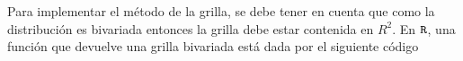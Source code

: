 Para implementar el método de la grilla, se debe tener en cuenta que como la distribución es bivariada entonces la grilla debe estar contenida en $R^2$. En $\verb'R'$, una función que devuelve una grilla bivariada está dada por el siguiente código
\begin{knitrout}
\color{fgcolor}\begin{kframe}
\begin{alltt}
 \hlkwb{<-}\hlstd{(}\hlstd{,}\hlstd{)\{}
   \hlkwb{<-}\hlstd{(}\hlopt{:}
    \hlkwb{<-}\hlstd{(}\hlstd{,}
   \hlkwb{<-}\hlstd{(}\hlopt{:}
    \hlkwb{<-}\hlstd{(}\hlstd{,}
   \hlkwb{<-}
   \hlkwb{<-}
   \hlkwb{<-}
 \hlstd{\}}
\end{alltt}
\end{kframe}
\end{knitrout}

